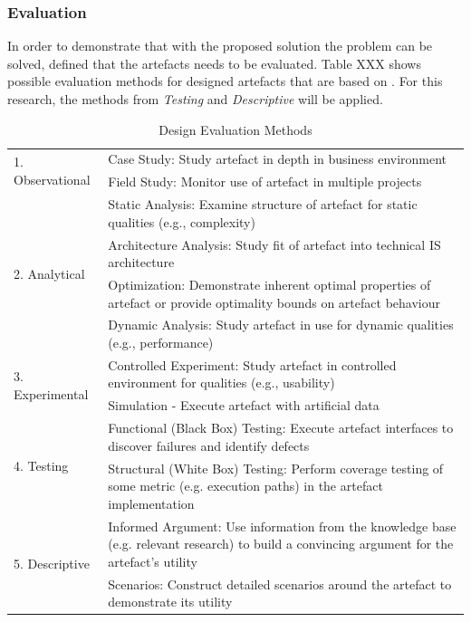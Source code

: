 
\subsubsection{Evaluation}

In order to demonstrate that with the proposed solution the problem can be solved, \cite{Hevner2010}  defined that the artefacts needs to be evaluated.
Table XXX shows possible evaluation methods for designed artefacts  that are based on \cite{Hevner2004}. For this research, the methods from \textit{Testing} and \textit{Descriptive} will be applied.


\begin{table}[h]
	\begin{center}
		\begin{tabular}{ | m{4cm} | p{10cm} | } 
			\hline
			\multirow{2}{*}{1. Observational} &
				Case Study: Study artefact in depth in business environment \\
				\cline{2-2}
				& Field Study: Monitor use of artefact in multiple projects \\
			\hline
			\multirow{4}{*}{2. Analytical} &
				Static Analysis: Examine structure of artefact for static qualities (e.g., complexity) \\
				\cline{2-2}
				& Architecture Analysis: Study fit of artefact into technical IS architecture \\
				\cline{2-2}
				& Optimization: Demonstrate inherent optimal properties of artefact or provide optimality bounds on artefact behaviour \\
				\cline{2-2}
				& Dynamic Analysis: Study artefact in use for dynamic qualities (e.g., performance) \\
			\hline
			\multirow{2}{*}{3. Experimental} &
				Controlled Experiment: Study artefact in controlled environment for qualities (e.g., usability) \\
				\cline{2-2}
				& Simulation - Execute artefact with artificial data \\
			\hline
			\multirow{2}{*}{4. Testing} &
				\cellcolor{green!25}Functional (Black Box) Testing:  Execute artefact interfaces to discover failures and identify defects \\
				\hhline{|~|-|}
				& \cellcolor{green!25}Structural (White Box) Testing:  Perform coverage testing of some metric (e.g. execution paths) in the artefact implementation \\
			\hline
			\multirow{2}{*}{5. Descriptive} &
				\cellcolor{green!25}Informed Argument:  Use information from the knowledge base (e.g. relevant research) to build a convincing argument for the artefact's utility \\
				\hhline{|~|-|}
				& \cellcolor{green!25}Scenarios: Construct detailed scenarios around the artefact to demonstrate its utility \\
			\hline
		\end{tabular}
		\caption[Design Evaluation Methods]{Design Evaluation Methods \citep[based on][]{Hevner2004}}
		\label{tbl:designevaluationmethods}
	\end{center}
\end{table}


